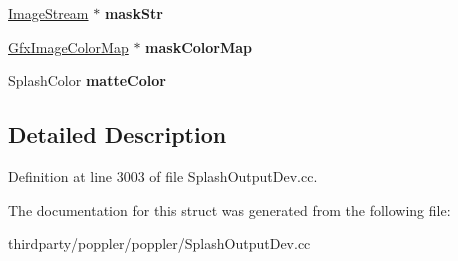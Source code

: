 \begin{DoxyCompactItemize}
\mbox{\label{struct_splash_out_image_data_a83bc33bf5a719693ccaa61cece316349}} 
\hyperlink{class_image_stream}{Image\+Stream} $\ast$ {\bfseries mask\+Str}
\item 
\mbox{\label{struct_splash_out_image_data_adb8a53503a84670f52784840cb76bdf1}} 
\hyperlink{class_gfx_image_color_map}{Gfx\+Image\+Color\+Map} $\ast$ {\bfseries mask\+Color\+Map}
\item 
\mbox{\label{struct_splash_out_image_data_ac6b61ce755a34d8320ad10aacb6e5644}} 
Splash\+Color {\bfseries matte\+Color}
\end{DoxyCompactItemize}


\subsection{Detailed Description}


Definition at line 3003 of file Splash\+Output\+Dev.\+cc.



The documentation for this struct was generated from the following file\+:\begin{DoxyCompactItemize}
\item 
thirdparty/poppler/poppler/Splash\+Output\+Dev.\+cc\end{DoxyCompactItemize}
